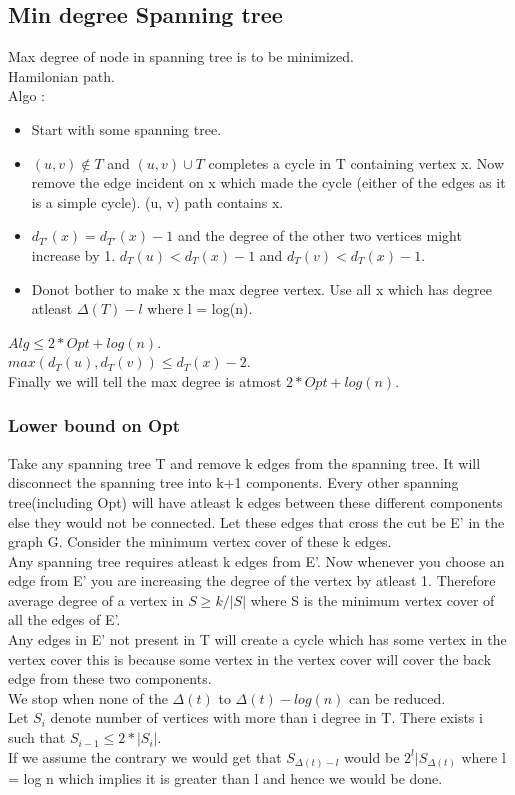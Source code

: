 \documentclass[solution,addpoints,12pt]{exam}
\begin{document}
\subsection{Min degree Spanning tree}
Max degree of node in spanning tree is to be minimized.\\
Hamilonian path.\\
Algo :\\
\begin{itemize}
\item Start with some spanning tree.
\item $(u, v) \not \in T$ and $(u, v) \cup T$ completes
a cycle in T containing vertex x. Now remove the edge
incident on x which made the cycle (either of the edges as it is a
simple cycle). (u, v) path contains x.
\item $d_{T'}(x) = d_{T'}(x)-1$ and the degree of the other two
vertices might increase by 1. $d_{T}(u) < d_{T}(x)-1$ and
$d_{T}(v) < d_{T}(x)-1$.
\item Donot bother to make x the max degree vertex. Use all x
which has degree atleast $\Delta(T) - l$ where l = log(n).
\end{itemize}
$Alg \le 2*Opt + log(n)$.\\
$max(d_T(u), d_T(v)) \le d_T(x) - 2$.\\
Finally we will tell the max degree is atmost $2*Opt + log(n)$.\\
\subsubsection{Lower bound on Opt}
Take any spanning tree T and remove k edges from the spanning tree.
It will disconnect the spanning tree into k+1 components.
Every other spanning tree(including Opt) will have atleast k edges between
these different components else they would not be connected. Let these
edges that cross the cut be E' in the graph G. Consider the minimum
vertex cover of these k edges.\\
Any spanning tree requires atleast
k edges from E'. Now whenever you choose an edge from E'
you are increasing the degree of the vertex by atleast 1. Therefore
average degree of a vertex in $S \ge k/|S|$ where S is the minimum
vertex cover of all the edges of E'.\\
Any edges in E' not present in T will create a cycle which
has some vertex in the vertex cover this is because some vertex  in the
vertex cover will cover the back edge from these two components.\\
We stop when none of the $\Delta(t)$ to $\Delta(t) - log(n)$
can be reduced.\\
Let $S_i$ denote number of vertices with more than i degree in T.
There exists i such that $S_{i-1} \le 2*|S_i|$.\\
If we assume the contrary we would get that $S_{\Delta(t) - l}$
would be $2^l|S_{\Delta(t)}$ where l = log n which implies
it is greater than l and hence we would be done.\\
\end{document}
